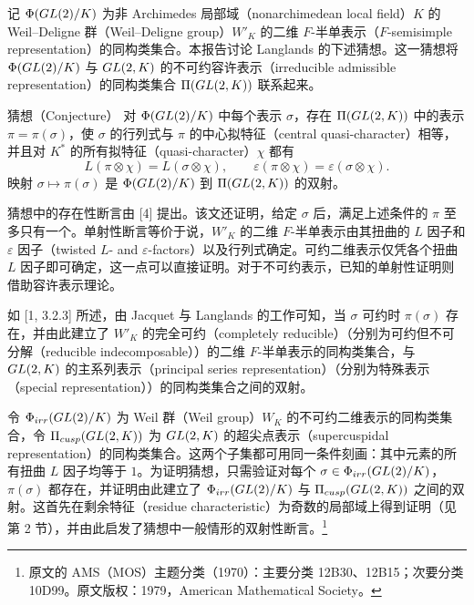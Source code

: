
记 $\Phi(GL(2)/K)$ 为非 Archimedes 局部域（nonarchimedean local field）$K$ 的 Weil--Deligne 群（Weil--Deligne group）$W'_K$ 的二维 $F$-半单表示（$F$-semisimple representation）的同构类集合。本报告讨论 Langlands 的下述猜想。这一猜想将 $\Phi(GL(2)/K)$ 与 $GL(2,K)$ 的不可约容许表示（irreducible admissible representation）的同构类集合 $\Pi(GL(2,K))$ 联系起来。

\begin{originaltheorem}{猜想（Conjecture）}
对 $\Phi(GL(2)/K)$ 中每个表示 $\sigma$，存在 $\Pi(GL(2,K))$ 中的表示 $\pi=\pi(\sigma)$，使 $\sigma$ 的行列式与 $\pi$ 的中心拟特征（central quasi-character）相等，并且对 $K^*$ 的所有拟特征（quasi-character）$\chi$ 都有
\[
 L(\pi\otimes\chi)=L(\sigma\otimes\chi),
 \qquad \varepsilon(\pi\otimes\chi)=\varepsilon(\sigma\otimes\chi).
\]
映射 $\sigma\mapsto\pi(\sigma)$ 是 $\Phi(GL(2)/K)$ 到 $\Pi(GL(2,K))$ 的双射。
\end{originaltheorem}

猜想中的存在性断言由 [4] 提出。该文还证明，给定 $\sigma$ 后，满足上述条件的 $\pi$ 至多只有一个。单射性断言等价于说，$W'_K$ 的二维 $F$-半单表示由其扭曲的 $L$ 因子和 $\varepsilon$ 因子（twisted $L$- and $\varepsilon$-factors）以及行列式确定。可约二维表示仅凭各个扭曲 $L$ 因子即可确定，这一点可以直接证明。对于不可约表示，已知的单射性证明则借助容许表示理论。

如 [1, 3.2.3] 所述，由 Jacquet 与 Langlands 的工作可知，当 $\sigma$ 可约时 $\pi(\sigma)$ 存在，并由此建立了 $W'_K$ 的完全可约（completely reducible）（分别为可约但不可分解（reducible indecomposable））的二维 $F$-半单表示的同构类集合，与 $GL(2,K)$ 的主系列表示（principal series representation）（分别为特殊表示（special representation））的同构类集合之间的双射。

令 $\Phi_{irr}(GL(2)/K)$ 为 Weil 群（Weil group）$W_K$ 的不可约二维表示的同构类集合，令 $\Pi_{cusp}(GL(2,K))$ 为 $GL(2,K)$ 的超尖点表示（supercuspidal representation）的同构类集合。这两个子集都可用同一条件刻画：其中元素的所有扭曲 $L$ 因子均等于 $1$。为证明猜想，只需验证对每个 $\sigma\in\Phi_{irr}(GL(2)/K)$，$\pi(\sigma)$ 都存在，并证明由此建立了 $\Phi_{irr}(GL(2)/K)$ 与 $\Pi_{cusp}(GL(2,K))$ 之间的双射。这首先在剩余特征（residue characteristic）为奇数的局部域上得到证明（见第 2 节），并由此启发了猜想中一般情形的双射性断言。\footnote{原文的 AMS（MOS）主题分类（1970）：主要分类 12B30、12B15；次要分类 10D99。原文版权：1979，American Mathematical Society。}

